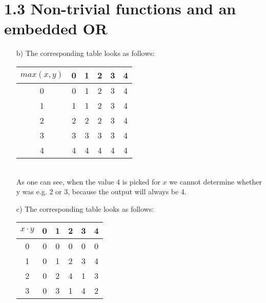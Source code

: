 \documentclass{article}
\begin{document}
	\section*{1.3 Non-trivial functions and an embedded OR}
	\begin{adjustwidth}{2em}{2em}
		\begin{enumerate}
			\item[b)] The corresponding table looks as follows: \\
			\begin{tabular}{| c | c | c | c | c | c |}
				\hline
				$max(x, y)$ & 0 & 1 & 2 & 3 & 4 \\
				\hline
				0 & \cellcolor[gray]{0.8}0 & \cellcolor[gray]{0.8}1 & \cellcolor[gray]{0.8}2 & \cellcolor[gray]{0.8}3 & 4 \\
				1 & \cellcolor[gray]{0.8}1 & \cellcolor[gray]{0.8}1 & \cellcolor[gray]{0.8}2 & \cellcolor[gray]{0.8}3 & 4 \\
				2 & \cellcolor[gray]{0.8}2 & \cellcolor[gray]{0.8}2 & \cellcolor[gray]{0.8}2 & \cellcolor[gray]{0.8}3 & 4 \\
				3 & \cellcolor[gray]{0.8}3 & \cellcolor[gray]{0.8}3 & \cellcolor[gray]{0.8}3 & \cellcolor[gray]{0.8}3 & 4 \\
				4 & \cellcolor[gray]{0.8}4 & \cellcolor[gray]{0.8}4 & \cellcolor[gray]{0.8}4 & \cellcolor[gray]{0.8}4 & 4 \\
				\hline
			\end{tabular} \\
			As one can see, when the value 4 is picked for $x$ we cannot determine whether y was e.g. 2 or 3, because the output will always be 4.
			\item[c)] The corresponding table looks as follows: \\
			\begin{tabular}{| c | c | c | c | c | c |}
				\hline
				$x \cdot y$ & 0 & 1 & 2 & 3 & 4 \\
				\hline
				0 & 0 & \cellcolor[gray]{0.8}0 & \cellcolor[gray]{0.8}0 & \cellcolor[gray]{0.8}0 & \cellcolor[gray]{0.8}0 \\
				1 & 0 & \cellcolor[gray]{0.8}1 & \cellcolor[gray]{0.8}2 & \cellcolor[gray]{0.8}3 & \cellcolor[gray]{0.8}4 \\
				2 & 0 & \cellcolor[gray]{0.8}2 & \cellcolor[gray]{0.8}4 & \cellcolor[gray]{0.8}1 & \cellcolor[gray]{0.8}3 \\
				3 & 0 & \cellcolor[gray]{0.8}3 & \cellcolor[gray]{0.8}1 & \cellcolor[gray]{0.8}4 & \cellcolor[gray]{0.8}2 \\

\end{tabular}
\end{enumerate}
\end{adjustwidth}
\end{document}
